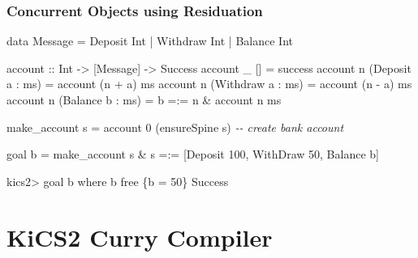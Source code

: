 \documentclass[
,hyperref={pdfpagelabels=false}
,xcolor=dvipsnames
]{beamer}
\newcommand{\blocktitle}[1]{%
{\medskip\usebeamerfont{subtitle}\usebeamercolor[fg]{subtitle}#1\smallskip}
}
\newcommand{\comment}[1]{\textsl{-{}- #1}}
\begin{document}
\begin{frame}[fragile]%
\frametitle{Concurrent Objects using Residuation}

\begin{curry}
data Message = Deposit Int | Withdraw Int | Balance Int

account :: Int -> [Message] -> Success
account _ []                 =  success
account n (Deposit  a : ms)  =  account (n + a) ms
account n (Withdraw a : ms)  =  account (n - a) ms
account n (Balance  b : ms)  =  b =:= n \& account n ms

make_account s = account 0 (ensureSpine s) \comment{create bank account}

goal b = make_account s
       \& s =:= [Deposit 100, WithDraw 50, Balance b]
\end{curry}

\begin{kics2}
kics2> goal b where b free
\{b = 50\} Success
\end{kics2}
\end{frame}

%
%
%
%
%


\section{KiCS2 Curry Compiler}
\end{document}
